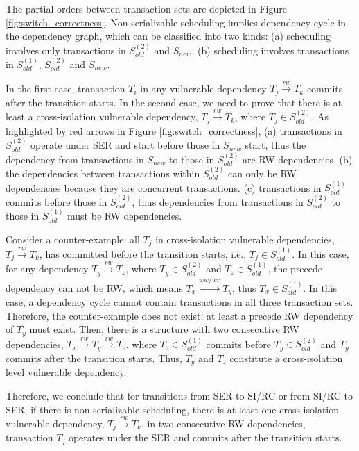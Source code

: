 {The partial orders between transaction sets are depicted in Figure \ref{fig:switch_correctness}. 
Non-serializable scheduling implies dependency cycle in the dependency graph, which can be classified into two kinds: (a) scheduling involves only transactions in $S_{old}^{(2)}$ and $S_{new}$; (b) scheduling involves transactions in $S_{old}^{(1)}$, $S_{old}^{(2)}$ and $S_{new}$. 

In the first case, transaction $T_i$ in any vulnerable dependency $T_j \xrightarrow{rw} T_k$ commits after the transition starts.
In the second case, we need to prove that there is at least a cross-isolation vulnerable dependency, $T_j\xrightarrow{rw} T_k$, where $T_j\in S_{old}^{(2)}$. As highlighted by red arrows in Figure \ref{fig:switch_correctness}, (a) transactions in $S_{old}^{(2)}$ operate under SER and start before those in $S_{new}$ start, thus the dependency from transactions in $S_{new}$ to those in $S_{old}^{(2)}$ are RW dependencies.
(b) the dependencies between transactions within $S_{old}^{(2)}$ can only be RW dependencies because they are concurrent transactions. 
(c) transactions in $S_{old}^{(1)}$ commits before those in $S_{old}^{(2)}$, thus dependencies from transactions in $S_{old}^{(2)}$ to those in $S_{old}^{(1)}$ must be RW dependencies. 

Consider a counter-example: all $T_j$ in cross-isolation vulnerable dependencies, $T_j \xrightarrow{rw} T_k$, has committed before the transition starts, i.e., $T_j \in S_{old}^{(1)}$. In this case, for any dependency $T_y \xrightarrow{rw} T_z$, where $T_y\in S_{old}^{(2)}$ and $T_z\in S_{old}^{(1)}$, the precede dependency can not be RW, which means $T_x \xrightarrow{ww/wr} T_y$, thus $T_x \in S_{old}^{(1)}$. In this case, a dependency cycle cannot contain transactions in all three transaction sets. Therefore, the counter-example does not exist; at least a precede RW dependency of $T_y$ must exist. Then, there is a structure with two consecutive RW dependencies, $T_x \xrightarrow{rw} T_y \xrightarrow{rw} T_z$, where $T_z \in S_{old}^{(1)}$ commits before $T_y \in S_{old}^{(2)}$ and $T_y$ commits after the transition starts. Thus, $T_y$ and $T_z$ constitute a cross-isolation level vulnerable dependency.

Therefore, we conclude that for transitions from SER to SI/RC or from SI/RC to SER, if there is non-serializable scheduling, there is at least one cross-isolation vulnerable dependency, $T_j \xrightarrow{rw} T_k$, in two consecutive RW dependencies, transaction $T_j$ operates under the SER and commits after the transition starts. 
}


